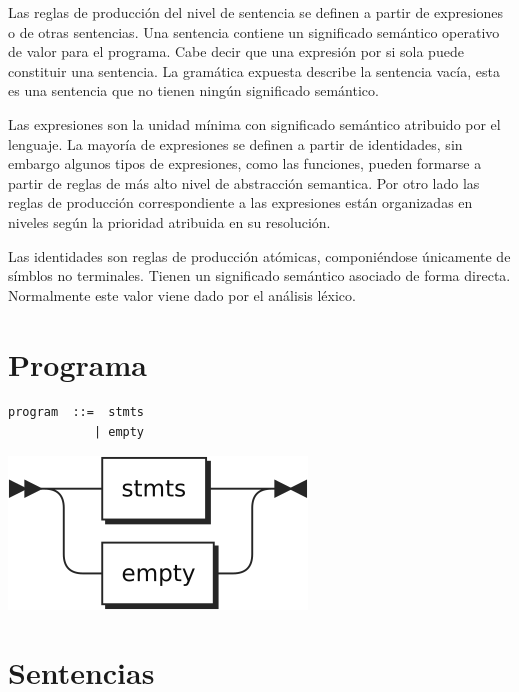 Las reglas de producción del nivel de sentencia se definen a 
partir de expresiones o de otras sentencias. Una sentencia contiene un significado semántico
operativo de valor para el programa. Cabe decir que una expresión por si sola 
puede constituir una sentencia. La gramática expuesta describe la sentencia
vacía, esta es una sentencia que no tienen ningún significado semántico.

Las expresiones son la unidad mínima con significado semántico atribuido por 
el lenguaje. La mayoría de expresiones se definen a partir de identidades, 
sin embargo algunos tipos de expresiones, como las funciones, pueden formarse
a partir de reglas de más alto nivel de abstracción semantica. Por otro lado las 
reglas de producción correspondiente a las expresiones están organizadas en niveles según
la prioridad atribuida en su resolución.

Las identidades son reglas de producción atómicas, componiéndose únicamente de símblos no terminales. 
Tienen un significado semántico asociado de forma directa. Normalmente este valor viene dado por 
el análisis léxico.  
 
\section{Programa}
\begin{multicols}{2}
\begin{lstlisting}[style=nonumbers]
program  ::=  stmts
            | empty
\end{lstlisting}  
\columnbreak
\begin{center}
\includegraphics[scale=0.7]{diagram/program.png} \\
\end{center}
\end{multicols}
\section{Sentencias}
